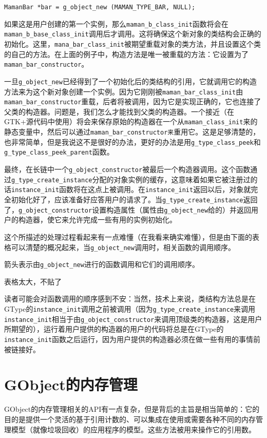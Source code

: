 \verb|MamanBar *bar = g_object_new (MAMAN_TYPE_BAR, NULL);|

如果这是用户创建的第一个实例，那么\verb|maman_b_class_init|函数将会在\verb|maman_b_base_class_init|调用后才调用。这将确保这个新对象的类结构会正确的初始化。这里，\verb|mana_bar_class_init|被期望重载对象的类方法，并且设置这个类的自己的方法。在上面的例子中，构造方法是唯一被重载的方法：它设置为了\verb|maman_bar_constructor|。

一旦\verb|g_object_new|已经得到了一个初始化后的类结构的引用，它就调用它的构造方法来为这个新对象创建一个实例。因为它刚刚被\verb|maman_bar_class_init|由\verb|maman_bar_constructor|重载，后者将被调用，因为它是实现正确的，它也连接了父类的构造器。问题是，我们怎么才能找到父类的构造器。一个接近（在GTK+源代码中使用）将会来保存原始的构造器在一个从\verb|maman_class_init|来的静态变量中，然后可以通过\verb|maman_bar_constructor来|重用它。这是足够清楚的，也非常简单，但是我说这不是很好的办法，更好的办法是用\verb|g_type_class_peek|和\verb|g_type_class_peek_parent|函数。

最终，在长链中一个\verb|g_object_constructor|被最后一个构造器调用。这个函数通过\verb|g_type_create_instance|分配的对象实例的缓存，这意味着如果它被注册过的话\verb|instance_init|函数将在这点上被调用。在\verb|instance_init|返回以后，对象就完全初始化好了，应该准备好应答用户的请求了。当\verb|g_type_create_instance|返回了，\verb|g_object_constructor|设置构造属性（属性由\verb|g_object_new|给的）并返回用户的构造器，使它来允许完成一些有用的实例初始化。

这个所描述的处理过程看起来有一点难懂（在我看来确实难懂），但是由下面的表格可以清楚的概况起来，当\verb|g_object_new|调用时，相关函数的调用顺序。

箭头表示由\verb|g_object_new|进行的函数调用和它们的调用顺序。

表格太大，不贴了

读者可能会对函数调用的顺序感到不安：当然，技术上来说，类结构方法总是在GType的\verb|instance_init|调用之前被调用（因为\verb|g_type_create_instance|来调用\verb|instance_init|相当于由\verb|g_object_constructor|来调用顶级类的构造器，这是用户所期望的），运行着用户提供的构造器的用户的代码将总是在GType的\verb|instance_init|函数之后运行，因为用户提供的构造器必须在做一些有用的事情前被链接好。

\section{GObject的内存管理}
GObject的内存管理相关的API有一点复杂，但是背后的主旨是相当简单的：它的目的是提供一个灵活的基于引用计数的、可以集成在使用或需要各种不同的内存管理模型（就像垃圾回收）的应用程序的模型。这些方法被用来操作它的引用数。

